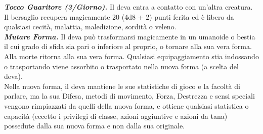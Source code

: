 \begin{multicols}{2}
\emph{\textbf{Tocco Guaritore (3/Giorno).}} Il deva entra a contatto con un'altra creatura. Il bersaglio recupera magicamente 20 (4d8 + 2) punti ferita ed è libero da qualsiasi cecità, malattia, maledizione, sordità o veleno.\\
\emph{\textbf{Mutare Forma.}} Il deva può trasformarsi magicamente in un umanoide o bestia il cui grado di sfida sia pari o inferiore al proprio, o tornare alla sua vera forma. Alla morte ritorna alla sua vera forma. Qualsiasi equipaggiamento stia indossando o trasportando viene assorbito o trasportato nella nuova forma (a scelta del deva).\\
Nella nuova forma, il deva mantiene le sue statistiche di gioco e la facoltà di parlare, ma la sua Difesa, metodi di movimento, Forza, Destrezza e sensi speciali vengono rimpiazzati da quelli della nuova forma, e ottiene qualsiasi statistica o capacità (eccetto i privilegi di classe, azioni aggiuntive e azioni da tana) possedute dalla sua nuova forma e non dalla sua originale.\\


\end{multicols}
